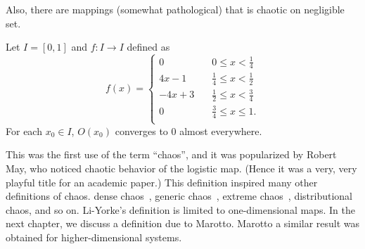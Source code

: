 \documentclass[12pt,draft,twoside]{book}
\begin{document}
Also, there are mappings  (somewhat pathological) that is chaotic on negligible set.
\begin{proposition}
  Let $I = [0,1]$ and $f: I \to I$ defined as
  \begin{equation*}
    f(x) =
    \begin{cases}
      0 \quad & 0\leq x < \frac{1}{4} \\
      4x - 1 \quad  & \frac{1}{4} \leq x < \frac{1}{2} \\
      -4x + 3 \quad & \frac{1}{2} \leq x < \frac{3}{4} \\
      0 \quad & \frac{3}{4} \leq x \leq 1. \\
    \end{cases}
  \end{equation*}
  For each $x_0 \in I$, $O(x_0)$ converges to 0 almost everywhere.
\end{proposition}

This was the first use of the term ``chaos'', and it was popularized by Robert May, who noticed chaotic behavior of the logistic map. %
(Hence it was a very, very playful title for an academic paper.)
This definition inspired many other definitions of chaos.
dense chaos~\citep{densechaos}, generic chaos~\citep{genericchaos}, extreme chaos~\citep{extremechaos}, distributional chaos, and so on. 
Li-Yorke's definition is limited to one-dimensional maps.
In the next chapter, we discuss a definition due to Marotto.
Marotto a similar result was obtained for higher-dimensional systems.




\printindex
\end{document}
